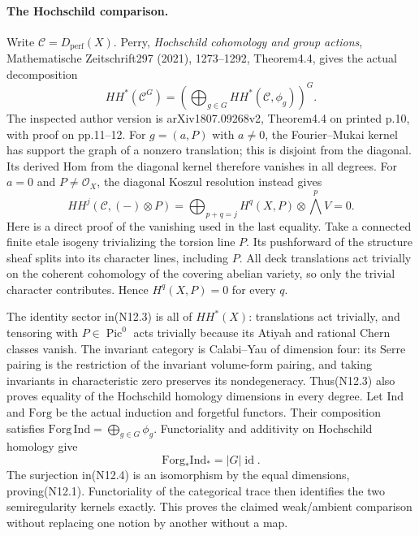 \paragraph{The Hochschild comparison.}
Write $\mathcal C=D_{\mathrm{perf}}(X)$.
Perry, \emph{Hochschild cohomology and group actions},
Mathematische Zeitschrift297 (2021), 1273--1292, Theorem4.4,
gives the actual decomposition
\[
 HH^*(\mathcal C^G)=
 \left(\bigoplus_{g\in G}HH^*(\mathcal C,\phi_g)\right)^G.
                                                               \tag{N12.3}
\]
The inspected author version is arXiv1807.09268v2,
Theorem4.4 on printed p.10, with proof on pp.11--12.
For $g=(a,P)$ with $a\ne0$, the Fourier--Mukai kernel has
support the graph of a nonzero translation; this is disjoint
from the diagonal. Its derived Hom from the diagonal kernel
therefore vanishes in all degrees.
For $a=0$ and $P\ne\mathcal O_X$, the diagonal Koszul resolution
instead gives
\[
 HH^j(\mathcal C,(-)\otimes P)
   =\bigoplus_{p+q=j}H^q(X,P)\otimes\bigwedge^pV=0.
\]
Here is a direct proof of the vanishing used in the last equality.
Take a connected finite etale isogeny trivializing the torsion
line $P$. Its pushforward of the structure sheaf splits into
its character lines, including $P$. All deck translations act
trivially on the coherent cohomology of the covering abelian
variety, so only the trivial character contributes. Hence
$H^q(X,P)=0$ for every $q$.

The identity sector in(N12.3) is all of $HH^*(X)$:
translations act trivially, and tensoring with $P\in\operatorname{Pic}^0$
acts trivially because its Atiyah and rational Chern classes vanish.
The invariant category is Calabi--Yau of dimension four: its
Serre pairing is the restriction of the invariant volume-form
pairing, and taking invariants in characteristic zero preserves
its nondegeneracy. Thus(N12.3) also proves equality of the
Hochschild homology dimensions in every degree.
Let $\mathrm{Ind}$ and $\mathrm{Forg}$ be the actual induction
and forgetful functors. Their composition satisfies
$\mathrm{Forg}\,\mathrm{Ind}=\bigoplus_{g\in G}\phi_g$.
Functoriality and additivity on Hochschild homology give
\[
 \mathrm{Forg}_*\mathrm{Ind}_*=|G|\operatorname{id}.
                                                               \tag{N12.4}
\]
The surjection in(N12.4) is an isomorphism by the equal dimensions,
proving(N12.1). Functoriality of the categorical trace then
identifies the two semiregularity kernels exactly. This proves
the claimed weak/ambient comparison without replacing one
notion by another without a map.

